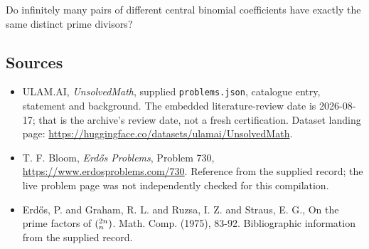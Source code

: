 \documentclass[11pt,a4paper]{article}
\begin{document}
Do infinitely many pairs of different central binomial coefficients have exactly the same distinct prime divisors?

\subsection{Sources}

{\small

\begin{itemize}

\item[\hypertarget{source:statement:1}{S1}] ULAM.AI, \emph{UnsolvedMath}, supplied \texttt{problems.json}, catalogue entry, statement and background. The embedded literature-review date is 2026-08-17; that is the archive’s review date, not a fresh certification. Dataset landing page: \url{https://huggingface.co/datasets/ulamai/UnsolvedMath}.

\item[\hypertarget{source:statement:2}{S2}] T. F. Bloom, \emph{Erdős Problems}, Problem 730, \url{https://www.erdosproblems.com/730}. Reference from the supplied record; the live problem page was not independently checked for this compilation.

\item[\hypertarget{source:statement:3}{S3}] Erd\H{o}s, P. and Graham, R. L. and Ruzsa, I. Z. and Straus, E. G., On the prime factors of $(\sp{2n}\sb{n})$. Math. Comp. (1975), 83-92. Bibliographic information from the supplied record.

\end{itemize}

}

\label{end:statement}
\end{document}
